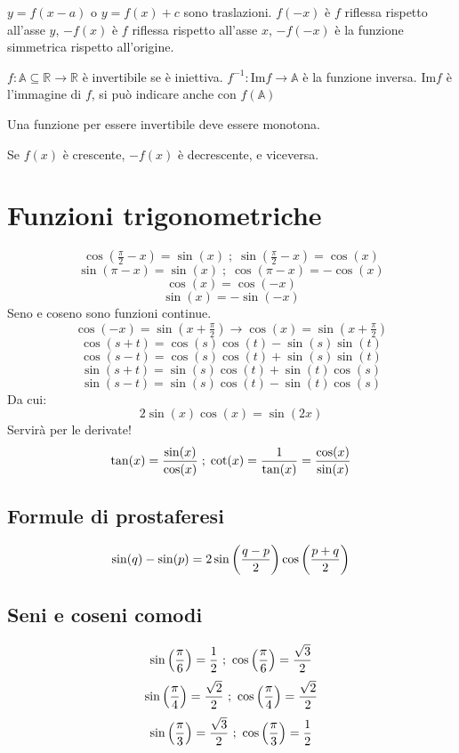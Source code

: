\documentclass[12pt,a4paper]{article}
\begin{document}
$y = f(x - a)$ o $y = f(x) + c$ sono traslazioni.
$f(-x)$ \`e $f$ riflessa rispetto all'asse $y$,
$-f(x)$ \`e $f$ riflessa rispetto all'asse $x$,
$-f(-x)$ \`e la funzione simmetrica rispetto all'origine.

$f: \mathbb{A} \subseteq \mathbb{R} \to \mathbb{R} $ \`e invertibile se \`e
iniettiva. $f^{-1} : \text{Im}f \to \mathbb{A} $ \`e la funzione inversa.
Im$f$ \`e l'immagine di $f$, si pu\`o indicare anche con $f(\mathbb{A})$

Una funzione per essere invertibile deve essere monotona.

Se $f(x)$ \`e crescente, $-f(x)$ \`e decrescente, e viceversa.

\newpage
\section{Funzioni trigonometriche}

$$ \cos(\tfrac{\pi}{2}-x) = \sin(x) \; ; \; \sin(\tfrac{\pi}{2}-x) 
= \cos(x) $$
$$ \sin(\pi - x) = \sin(x) \; ; \; \cos(\pi - x) = - \cos(x) $$
$$ \cos(x) = \cos(-x) $$
$$ \sin(x) = -\sin(-x) $$
Seno e coseno sono funzioni continue.
$$ \cos(-x) = \sin(x + \tfrac{\pi}{2}) \to \cos(x) 
= \sin(x + \tfrac{\pi}{2}) $$
$$ \cos(s+t) = \cos(s) \cos(t) - \sin(s) \sin(t) $$
$$ \cos(s-t) = \cos(s) \cos(t) + \sin(s) \sin(t) $$
$$ \sin(s+t) = \sin(s) \cos(t) + \sin(t) \cos(s) $$
$$ \sin(s-t) = \sin(s) \cos(t) - \sin(t) \cos(s) $$
Da cui:
$$ 2 \sin(x) \cos(x) = \sin(2x) $$
Servir\`a per le derivate!
$$ \tan(x) = {\sin(x) \over \cos(x)} \; ; \; 
\cot(x) = {1 \over \tan(x)} = {\cos(x) \over \sin(x)}$$

\subsection{Formule di prostaferesi}
$$ \sin(q) - \sin(p) = 2 \sin \left({q - p \over 2}\right) \cos 
\left({p+q \over 2}\right) $$

\subsection{Seni e coseni comodi}
$$ \sin \left( {\pi \over 6} \right) = {1 \over 2} \ ; \
 \cos \left( {\pi \over 6} \right) = {\sqrt{3} \over 2} $$
$$ \sin \left( {\pi \over 4} \right) = {\sqrt{2} \over 2} \ ; \
 \cos \left( {\pi \over 4} \right) = {\sqrt{2} \over 2} $$
$$ \sin \left( {\pi \over 3} \right) = {\sqrt{3} \over 2} \ ; \
 \cos \left( {\pi \over 3} \right) = {1 \over 2} $$
\end{document}
